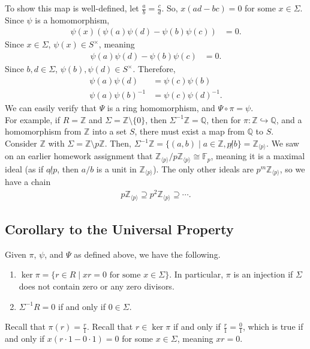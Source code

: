 \documentclass[10pt]{extarticle}
\newcommand{\Q}{\mathbb{Q}}
\newcommand{\Z}{\mathbb{Z}}
\begin{document}
  To show this map is well-defined, let $\frac{a}{b} = \frac{c}{d}$. So, $x(ad-bc) = 0$ for some $x\in\Sigma$. Since $\psi$ is a homomorphism,
  \begin{align*}
    \psi(x)(\psi(a)\psi(d) - \psi(b)\psi(c)) &= 0.
  \end{align*}
  Since $x\in \Sigma$, $\psi(x)\in S^{\times}$, meaning
  \begin{align*}
    \psi(a)\psi(d) - \psi(b)\psi(c) &= 0.
  \end{align*}
  Since $b,d\in\Sigma$, $\psi(b),\psi(d)\in S^{\times}$. Therefore,
  \begin{align*}
    \psi(a)\psi(d) &= \psi(c)\psi(b)\\
    \psi(a)\psi(b)^{-1} &= \psi(c)\psi(d)^{-1}.
  \end{align*}
  We can easily verify that $\Psi$ is a ring homomorphism, and $\Psi\circ \pi = \psi$.\\

  For example, if $R = \Z$ and $\Sigma = \Z\setminus\{0\}$, then $\Sigma^{-1}\Z = \Q$, then for $\pi: \Z\hookrightarrow \Q$, and a homomorphism from $\Z$ into a set $S$, there must exist a map from $\Q$ to $S$.\\

  Consider $\Z$ with $\Sigma = \Z\setminus p\Z$. Then, $\Sigma^{-1}\Z = \{(a,b)\mid a\in\Z, p\not|b\} = \Z_{\langle p \rangle}$. We saw on an earlier homework assignment that $\Z_{\langle p \rangle}/p\Z_{\langle p \rangle} \cong \mathbb{F}_p$, meaning it is a maximal ideal (as if $a\not| p$, then $a/b$ is a unit in $\Z_{\langle p \rangle}$). The only other ideals are $p^m \Z_{\langle p \rangle}$, so we have a chain
  \begin{align*}
    p\Z_{\langle p \rangle} \supseteq p^2\Z_{\langle p \rangle} \supseteq \cdots.
  \end{align*}
  \subsection{Corollary to the Universal Property}%
  Given $\pi$, $\psi$, and $\Psi$ as defined above, we have the following.
  \begin{enumerate}[(1)]
    \item $\ker \pi = \{r\in R\mid xr = 0\text{ for some }x\in \Sigma\}$. In particular, $\pi$ is an injection if $\Sigma$ does not contain zero or any zero divisors.
    \item $\Sigma^{-1}R = 0$ if and only if $0\in \Sigma$.
  \end{enumerate}
  Recall that $\pi(r) = \frac{r}{1}$. Recall that $r\in \ker\pi$ if and only if $\frac{r}{1} = \frac{0}{1}$, which is true if and only if $x(r\cdot 1 - 0\cdot 1) = 0$ for some $x\in \Sigma$, meaning $xr = 0$.\\
\end{document}
